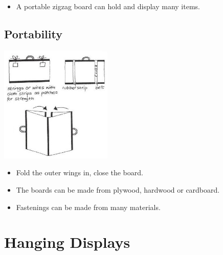 \begin{multicols}{2}
\begin{itemize}
\item A portable zigzag board can hold and display many items.
\end{itemize}

\vfill
\columnbreak

\subsection{Portability}

\begin{center}
\includegraphics[width=0.4\textwidth]{./img/vso/zigzag-portability.jpg}
\end{center}

\begin{itemize}
\item Fold the outer wings in,
close the board.
\item The boards can be made from
plywood, hardwood or
cardboard.
\item Fastenings can be made from
many materials.
\end{itemize}

%
%


\section{Hanging Displays}



\end{multicols}
